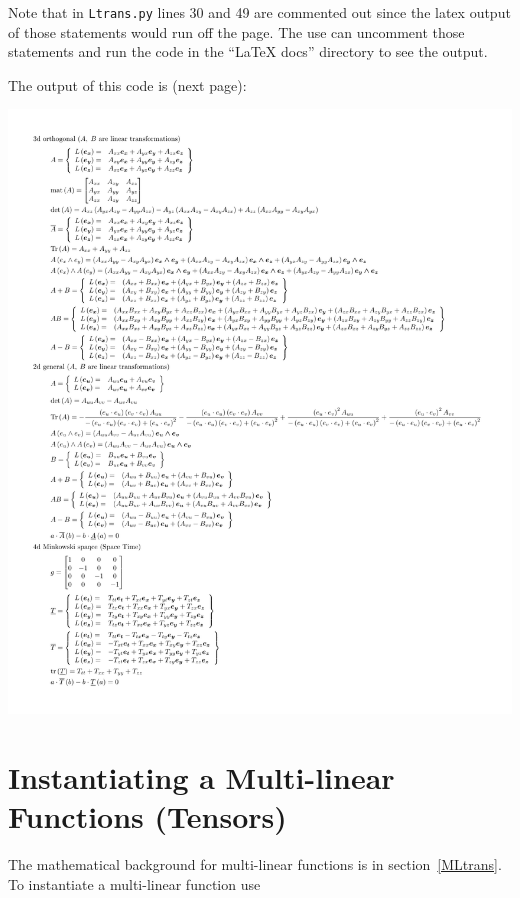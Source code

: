 \documentclass[12pt,twoside,openright]{memoir}
\newcommand{\T}[1]{\texttt{#1}}
\newcommand{\includecode}[1]{}
\begin{document}
Note that in \T{Ltrans.py} lines 30 and 49 are commented out since the latex output of those statements would run off the page.  The
use can uncomment those statements and run the code in the ``LaTeX docs'' directory to see the output.
\includecode{python/Ltrans.py}
The output of this code is (next page): \newpage
\begin{center}
	\includegraphics[scale=0.80]{python/Ltrans.pdf}
\end{center}
\section{Instantiating a Multi-linear Functions (Tensors)}

The mathematical background for multi-linear functions is in section~\ref{MLtrans}.  To instantiate a multi-linear function use
\end{document}
